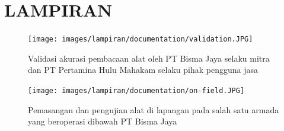 \chapter*{LAMPIRAN}


\begin{figure}[!h]
    \texttt{[image: images/lampiran/documentation/validation.JPG]}
    \caption{Validasi akurasi pembacaan alat oleh PT Bisma Jaya selaku mitra dan PT Pertamina Hulu Mahakam selaku pihak pengguna jasa}
    \label{fig:doc-validation}
\end{figure}

\begin{figure}[!h]
    \texttt{[image: images/lampiran/documentation/on-field.JPG]}
    \caption{Pemasangan dan pengujian alat di lapangan pada salah satu armada yang beroperasi dibawah PT Bisma Jaya}
    \label{fig:doc-lapangan}
\end{figure}

